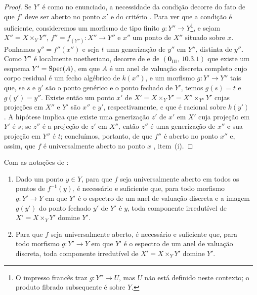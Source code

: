 \begin{proof}
Se $Y'$ é como no enunciado, a necessidade da condição decorre do fato de que $f'$ deve ser aberto no ponto $x'$ e do critério .
Para ver que a condição é suficiente, consideremos um morfismo de tipo finito $g:Y''\to Y$\footnote{O impresso francês traz $g:Y''\to U$, mas $U$ não está definido neste contexto; o produto fibrado subsequente é sobre $Y$.}, e sejam $X''=X\times_Y Y''$, $f''=f_{(Y'')}:X''\to Y''$ e $x''$ um ponto de $X''$ situado sobre $x$.
Ponhamos $y''=f''(x'')$ e seja $t$ uma generização de $y''$ em $Y''$, distinta de $y''$.
Como $Y''$ é localmente noetheriano, decorre de  e de $(\mathbf{0}_{\mathrm{III}},\,10.3.1)$ que existe um esquema $Y'=\operatorname{Spec}(A)$, em que $A$ é um anel de valuação discreta completo cujo corpo residual é um fecho algébrico de $k(x'')$, e um morfismo $g:Y'\to Y''$ tais que, se $s$ e $y'$ são o ponto genérico e o ponto fechado de $Y'$, temos $g(s)=t$ e $g(y')=y''$.
Existe então um ponto $x'$ de $X'=X\times_Y Y'=X''\times_{Y''}Y'$ cujas projeções em $X''$ e $Y'$ são $x''$ e $y'$, respectivamente, e que é racional sobre $k(y')$ .
A hipótese implica que existe uma generização $z'$ de $x'$ em $X'$ cuja projeção em $Y'$ é $s$; se $z''$ é a projeção de $z'$ em $X''$, então $z''$ é uma generização de $x''$ e sua projeção em $Y''$ é $t$; concluímos, portanto, de  que $f''$ é aberto no ponto $x''$ e, assim, que $f$ é universalmente aberto no ponto $x$ , item~(i).
\end{proof}

\begin{corollary}[14.3.7]
\label{IV.14.3.7}
Com as notações de :
\begin{enumerate}[label=(\roman*)]
  \item Dado um ponto $y\in Y$, para que $f$ seja universalmente aberto em todos os pontos de $f^{-1}(y)$, é necessário e suficiente que, para todo morfismo $g:Y'\to Y$ em que $Y'$ é o espectro de um anel de valuação discreta e a imagem $g(y')$ do ponto fechado $y'$ de $Y'$ é $y$, toda componente irredutível de $X'=X\times_Y Y'$ domine $Y'$.
  \item Para que $f$ seja universalmente aberto, é necessário e suficiente que, para todo morfismo $g:Y'\to Y$ em que $Y'$ é o espectro de um anel de valuação discreta, toda componente irredutível de $X'=X\times_Y Y'$ domine $Y'$.
\end{enumerate}
\end{corollary}


